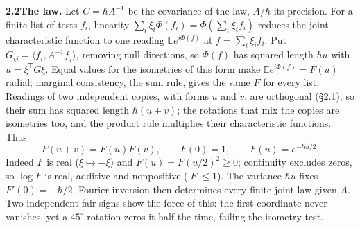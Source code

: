 \documentclass[10pt,a4paper]{article}
\newcommand{\E}{\mathbb{E}}
\begin{document}
\medskip
\noindent\textbf{2.2\enspace The law.} Let $C = \hbar A^{-1}$ be the covariance of the law, $A/\hbar$ its precision. For a finite list of tests $f_i$, linearity $\sum_i \xi_i\Phi(f_i) = \Phi(\sum_i \xi_i f_i)$ reduces the joint characteristic function to one reading $\E e^{i\Phi(f)}$ at $f = \sum_i \xi_i f_i$. Put $G_{ij} = \langle f_i, A^{-1} f_j\rangle$, removing null directions, so $\Phi(f)$ has squared length $\hbar u$ with $u = \xi^{\mathsf{T}} G \xi$. Equal values for the isometries of this form make $\E e^{i\Phi(f)} = F(u)$ radial; marginal consistency, the sum rule, gives the same $F$ for every list. Readings of two independent copies, with forms $u$ and $v$, are orthogonal (\S2.1), so their sum has squared length $\hbar(u+v)$; the rotations that mix the copies are isometries too, and the product rule multiplies their characteristic functions. Thus
\begin{equation}
  F(u + v) = F(u)F(v), \qquad F(0) = 1, \qquad F(u) = e^{-\hbar u/2}.
\end{equation}
Indeed $F$ is real ($\xi \mapsto -\xi$) and $F(u) = F(u/2)^2 \ge 0$; continuity excludes zeros, so $\log F$ is real, additive and nonpositive ($|F| \le 1$). The variance $\hbar u$ fixes $F'(0) = -\hbar/2$. Fourier inversion then determines every finite joint law given $A$. Two independent fair signs show the force of this: the first coordinate never vanishes, yet a $45^\circ$ rotation zeros it half the time, failing the isometry test.
\end{document}
